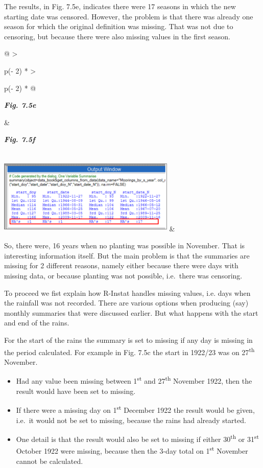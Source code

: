 \documentclass[
  letterpaper,
  DIV=11,
  numbers=noendperiod]{scrreprt}
\begin{document}
The results, in Fig. 7.5e, indicates there were 17 seasons in which the
new starting date was censored. However, the problem is that there was
already one season for which the original definition was missing. That
was not due to censoring, but because there were also missing values in
the first season.

\begin{longtable}[]{@{}
  >{\raggedright\arraybackslash}p{(\columnwidth - 2\tabcolsep) * }
  >{\raggedright\arraybackslash}p{(\columnwidth - 2\tabcolsep) * }@{}}
\toprule\noalign{}
\begin{minipage}[b]{\linewidth}\raggedright
\textbf{\emph{Fig. 7.5e}}
\end{minipage} & \begin{minipage}[b]{\linewidth}\raggedright
\textbf{\emph{Fig. 7.5f}}
\end{minipage} \\
\midrule\noalign{}
\endhead
\bottomrule\noalign{}
\endlastfoot
\includegraphics[width=3.32002in,height=1.41801in]{figures/Fig7.5e.png}
& \\
\end{longtable}

So, there were, 16 years when no planting was possible in November. That
is interesting information itself. But the main problem is that the
summaries are missing for 2 different reasons, namely either because
there were days with missing data, or because planting was not possible,
i.e.~there was censoring.

To proceed we fist explain how R-Instat handles missing values, i.e.
days when the rainfall was not recorded. There are various options when
producing (say) monthly summaries that were discussed earlier. But what
happens with the start and end of the rains.

For the start of the rains the summary is set to missing if any day is
missing in the period calculated. For example in Fig. 7.5c the start in
1922/23 was on 27\textsuperscript{th} November.

\begin{itemize}
\item
  Had any value been missing between 1\textsuperscript{st} and
  27\textsuperscript{th} November 1922, then the result would have been
  set to missing.
\item
  If there were a missing day on 1\textsuperscript{st} December 1922 the
  result would be given, i.e.~it would not be set to missing, because
  the rains had already started.
\item
  One detail is that the result would also be set to missing if either
  30\textsuperscript{th} or 31\textsuperscript{st} October 1922 were
  missing, because then the 3-day total on 1\textsuperscript{st}
  November cannot be calculated.
\end{itemize}
\end{document}
